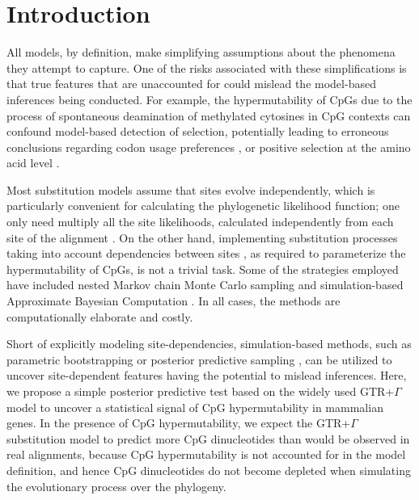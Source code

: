 \documentclass{article}
\begin{document}
\clearpage
\linenumbers
\section*{Introduction}
All models, by definition, make simplifying assumptions about the phenomena they attempt to capture.  One of the risks associated with these simplifications is that true features that are unaccounted for could mislead the model-based inferences being conducted.  For example, the hypermutability of CpGs due to the process of spontaneous deamination of methylated cytosines in CpG contexts \citep{Bird1980,Burge1992} can confound model-based detection of selection, potentially leading to erroneous conclusions regarding codon usage preferences \citep{LaurinLemay2018a}, or positive selection at the amino acid level \citep{LaurinLemay2022}.

Most substitution models assume that sites evolve independently, which is particularly convenient for calculating the phylogenetic likelihood function; one only need multiply all the site likelihoods, calculated independently from each site of the alignment \citep{Felsenstein1981}.  On the other hand, implementing substitution processes taking into account dependencies between sites \citep[e.g.,][]{Robinson2003,Rodrigue2009,LaurinLemay2018b,Meyer2019}, as required to parameterize the hypermutability of CpGs, is not a trivial task.  Some of the strategies employed have included nested Markov chain Monte Carlo sampling \citep[e.g.,][]{Robinson2003,Rodrigue2009} and simulation-based Approximate Bayesian Computation \citep[e.g.,][]{LaurinLemay2018b}.  In all cases, the methods are computationally elaborate and costly.

Short of explicitly modeling site-dependencies, simulation-based methods, such as parametric bootstrapping \citep{Efron1979,Efron1993} or posterior predictive sampling \citep{Gelman1996,Brown2018}, can be utilized to uncover site-dependent features having the potential to mislead inferences.  Here, we propose a simple posterior predictive test based on the widely used GTR+$\Gamma$ model to uncover a statistical signal of CpG hypermutability in mammalian genes.  In the presence of CpG hypermutability, we expect the GTR+$\Gamma$ substitution model to predict more CpG dinucleotides than would be observed in real alignments, because CpG hypermutability is not accounted for in the model definition, and hence CpG dinucleotides do not become depleted when simulating the evolutionary process over the phylogeny.
\end{document}
